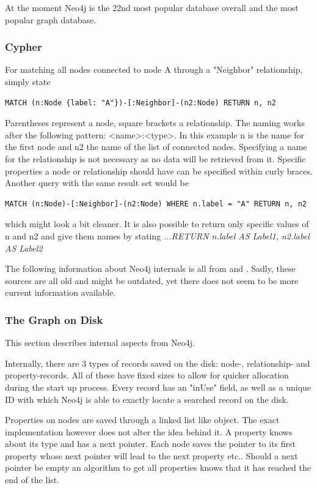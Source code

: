 At the moment Neo4j is the 22nd most popular database overall \cite{DbEnginesGeneral} and the most popular graph database. \cite{DbEnginesGraph}

\subsubsection{Cypher}
For matching all nodes connected to node A through a "Neighbor" relationship, simply state
\lstset{language=Cypher}
\begin{lstlisting}[label={ex231},caption={Matching Nodes Way 1}]
MATCH (n:Node {label: "A"})-[:Neighbor]-(n2:Node) RETURN n, n2
\end{lstlisting}
Parentheses represent a node, square brackets a relationship. The naming works after the following pattern: <name>:<type>. In this example n is the name for the first node and n2 the name of the list of connected nodes. Specifying a name for the relationship is not necessary as no data will be retrieved from it. Specific properties a node or relationship should have can be specified within curly braces. Another query with the same result set would be
\begin{lstlisting}[label={ex232},caption={Matching Nodes Way 2}]
MATCH (n:Node)-[:Neighbor]-(n2:Node) WHERE n.label = "A" RETURN n, n2
\end{lstlisting}
which might look a bit cleaner. It is also possible to return only specific values of n and n2 and give them names by stating
\emph{ ...RETURN n.label AS Label1, n2.label AS Label2 }

The following information about Neo4j internals is all from \cite{NeoInternals} and \cite{Neo4jInternalsPP}. Sadly, these sources are all old and might be outdated, yet there does not seem to be more current information available.

\subsubsection{The Graph on Disk}
This section describes internal aspects from Neo4j.

Internally, there are 3 types of records saved on the disk: node-, relationship- and property-records. All of these have fixed sizes to allow for quicker allocation during the start up process. Every record has an "inUse" field, as well as a unique ID with which Neo4j is able to exactly locate a searched record on the disk. \citep[minute 08]{NeoInternals}

Properties on nodes are saved through a linked list like object. The exact implementation however does not alter the idea behind it. A property knows about its type and has a next pointer. Each node saves the pointer to its first property whose next pointer will lead to the next property etc.. Should a next pointer be empty an algorithm to get all properties knows that it has reached the end of the list.\cite{NeoInternals}

